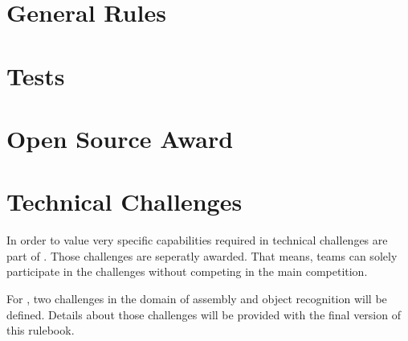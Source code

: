 \documentclass[11pt, twoside, openright, a4paper, chapterprefix]{scrbook}
\begin{document}
\chapter{General Rules}




\chapter{Tests}




\chapter{Open Source Award}


\chapter{Technical Challenges} \label{cha:TechnicalChallenges}
In order to value very specific capabilities required in \RCAW technical challenges are part of \RCAW. Those challenges are seperatly awarded. That means, teams can solely participate in the challenges without competing in the main competition. 

For \YEAR, two challenges in the domain of assembly and object recognition will be defined. Details about those challenges will be provided with the final version of this rulebook. 

%


\printabx
\printidx
\end{document}
